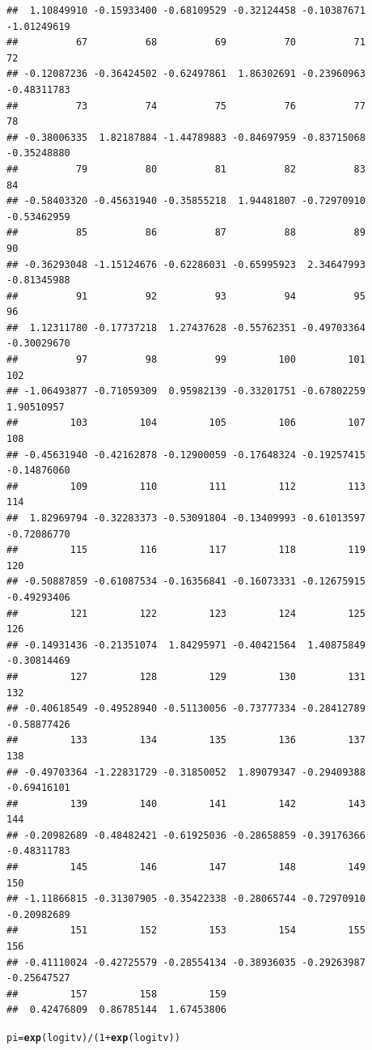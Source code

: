 \documentclass{article}\usepackage[]{graphicx}\usepackage[]{color}
\makeatletter
\newcommand{\hlnum}[1]{\textcolor[rgb]{0.686,0.059,0.569}{#1}}%
\newcommand{\hlopt}[1]{\textcolor[rgb]{0,0,0}{#1}}%
\newcommand{\hlstd}[1]{\textcolor[rgb]{0.345,0.345,0.345}{#1}}%
\newcommand{\hlkwb}[1]{\textcolor[rgb]{0.69,0.353,0.396}{#1}}%
\newcommand{\hlkwd}[1]{\textcolor[rgb]{0.737,0.353,0.396}{\textbf{#1}}}%
\newenvironment{kframe}{%
 \def\at@end@of@kframe{}%
 \ifinner\ifhmode%
  \def\at@end@of@kframe{\end{minipage}}%
  \begin{minipage}{\columnwidth}%
 \fi\fi%
 \def\FrameCommand##1{\hskip\@totalleftmargin \hskip-\fboxsep
 \colorbox{shadecolor}{##1}\hskip-\fboxsep
     \hskip-\linewidth \hskip-\@totalleftmargin \hskip\columnwidth}%
 \MakeFramed {\advance\hsize-\width
   \@totalleftmargin\z@ \linewidth\hsize
   \@setminipage}}%
 {\par\unskip\endMakeFramed%
 \at@end@of@kframe}
\newenvironment{knitrout}{}{} %
\makeatother
\begin{document}
\begin{enumerate}[(a)]
\begin{knitrout}
\begin{kframe}
\begin{verbatim}
##  1.10849910 -0.15933400 -0.68109529 -0.32124458 -0.10387671 -1.01249619 
##          67          68          69          70          71          72 
## -0.12087236 -0.36424502 -0.62497861  1.86302691 -0.23960963 -0.48311783 
##          73          74          75          76          77          78 
## -0.38006335  1.82187884 -1.44789883 -0.84697959 -0.83715068 -0.35248880 
##          79          80          81          82          83          84 
## -0.58403320 -0.45631940 -0.35855218  1.94481807 -0.72970910 -0.53462959 
##          85          86          87          88          89          90 
## -0.36293048 -1.15124676 -0.62286031 -0.65995923  2.34647993 -0.81345988 
##          91          92          93          94          95          96 
##  1.12311780 -0.17737218  1.27437628 -0.55762351 -0.49703364 -0.30029670 
##          97          98          99         100         101         102 
## -1.06493877 -0.71059309  0.95982139 -0.33201751 -0.67802259  1.90510957 
##         103         104         105         106         107         108 
## -0.45631940 -0.42162878 -0.12900059 -0.17648324 -0.19257415 -0.14876060 
##         109         110         111         112         113         114 
##  1.82969794 -0.32283373 -0.53091804 -0.13409993 -0.61013597 -0.72086770 
##         115         116         117         118         119         120 
## -0.50887859 -0.61087534 -0.16356841 -0.16073331 -0.12675915 -0.49293406 
##         121         122         123         124         125         126 
## -0.14931436 -0.21351074  1.84295971 -0.40421564  1.40875849 -0.30814469 
##         127         128         129         130         131         132 
## -0.40618549 -0.49528940 -0.51130056 -0.73777334 -0.28412789 -0.58877426 
##         133         134         135         136         137         138 
## -0.49703364 -1.22831729 -0.31850052  1.89079347 -0.29409388 -0.69416101 
##         139         140         141         142         143         144 
## -0.20982689 -0.48482421 -0.61925036 -0.28658859 -0.39176366 -0.48311783 
##         145         146         147         148         149         150 
## -1.11866815 -0.31307905 -0.35422338 -0.28065744 -0.72970910 -0.20982689 
##         151         152         153         154         155         156 
## -0.41110024 -0.42725579 -0.28554134 -0.38936035 -0.29263987 -0.25647527 
##         157         158         159 
##  0.42476809  0.86785144  1.67453806
\end{verbatim}
\begin{alltt}
  \hlstd{pi} \hlkwb{=} \hlkwd{exp}\hlstd{(logitv)}\hlopt{/}\hlstd{(}\hlnum{1}\hlopt{+}\hlkwd{exp}\hlstd{(logitv))}

\end{alltt}
\end{kframe}
\end{knitrout}
\end{enumerate}
\end{document}
